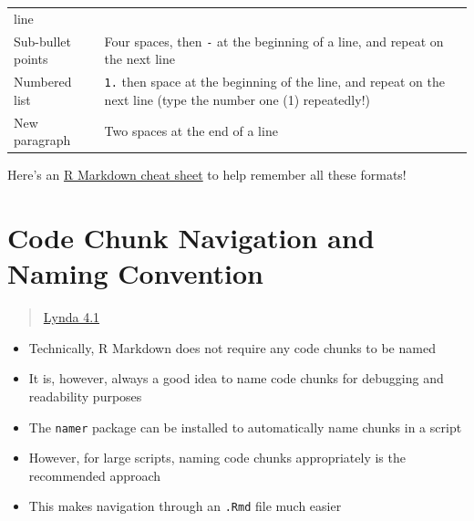 \documentclass[]{article}
\providecommand{\tightlist}{%
  \setlength{\itemsep}{0pt}\setlength{\parskip}{0pt}}
\begin{document}
\begin{longtable}[]{@{}ll@{}}
\begin{minipage}[t]{0.47\columnwidth}
line\strut
\end{minipage}\tabularnewline
\begin{minipage}[t]{0.47\columnwidth}\raggedright
Sub-bullet points\strut
\end{minipage} & \begin{minipage}[t]{0.47\columnwidth}\raggedright
Four spaces, then \texttt{-} at the beginning of a line, and repeat on
the next line\strut
\end{minipage}\tabularnewline
\begin{minipage}[t]{0.47\columnwidth}\raggedright
Numbered list\strut
\end{minipage} & \begin{minipage}[t]{0.47\columnwidth}\raggedright
\texttt{1.} then space at the beginning of the line, and repeat on the
next line (type the number one (1) repeatedly!)\strut
\end{minipage}\tabularnewline
\begin{minipage}[t]{0.47\columnwidth}\raggedright
New paragraph\strut
\end{minipage} & \begin{minipage}[t]{0.47\columnwidth}\raggedright
Two spaces at the end of a line\strut
\end{minipage}\tabularnewline
\bottomrule
\end{longtable}

Here's an
\href{https://www.rstudio.com/wp-content/uploads/2015/02/rmarkdown-cheatsheet.pdf}{R
Markdown cheat sheet} to help remember all these formats!

\hypertarget{code-chunk-navigation-and-naming-convention}{%
\section{Code Chunk Navigation and Naming
Convention}\label{code-chunk-navigation-and-naming-convention}}

\begin{quote}
\href{https://www.lynda.com/RStudio-tutorials/Name-your-code-chunks-sensibly/699348/2801133-4.html?srchtrk=index\%3a1\%0alinktypeid\%3a2\%0aq\%3ar+markdown\%0apage\%3a1\%0as\%3arelevance\%0asa\%3atrue\%0aproducttypeid\%3a2}{Lynda
4.1}
\end{quote}

\begin{itemize}
\tightlist
\item
  Technically, R Markdown does not require any code chunks to be named
\item
  It is, however, always a good idea to name code chunks for debugging
  and readability purposes
\item
  The \texttt{namer} package can be installed to automatically name
  chunks in a script
\item
  However, for large scripts, naming code chunks appropriately is the
  recommended approach
\item
  This makes navigation through an \texttt{.Rmd} file much easier
\end{itemize}
\end{document}
